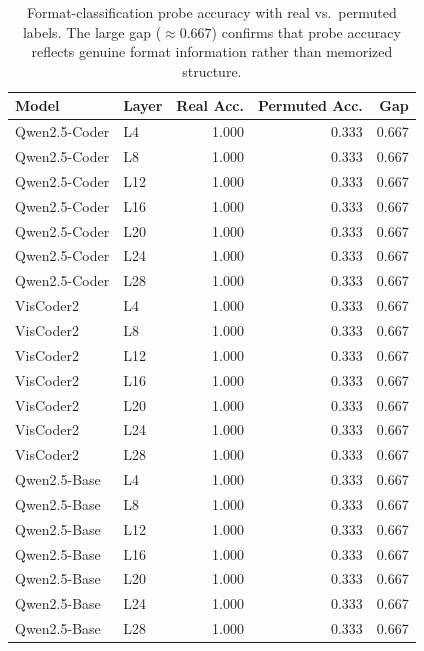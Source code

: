 \begin{table}[t]
\centering
\caption{Format-classification probe accuracy with real vs.\ permuted labels.  The large gap ($\approx 0.667$) confirms that probe accuracy reflects genuine format information rather than memorized structure.}
\label{tab:permuted_probe}
\small
\begin{tabular}{ll rrr}
\toprule
\textbf{Model} & \textbf{Layer} & \textbf{Real Acc.} & \textbf{Permuted Acc.} & \textbf{Gap} \\
\midrule
Qwen2.5-Coder & L4  & 1.000 & 0.333 & 0.667 \\
Qwen2.5-Coder & L8  & 1.000 & 0.333 & 0.667 \\
Qwen2.5-Coder & L12 & 1.000 & 0.333 & 0.667 \\
Qwen2.5-Coder & L16 & 1.000 & 0.333 & 0.667 \\
Qwen2.5-Coder & L20 & 1.000 & 0.333 & 0.667 \\
Qwen2.5-Coder & L24 & 1.000 & 0.333 & 0.667 \\
Qwen2.5-Coder & L28 & 1.000 & 0.333 & 0.667 \\
\midrule
VisCoder2      & L4  & 1.000 & 0.333 & 0.667 \\
VisCoder2      & L8  & 1.000 & 0.333 & 0.667 \\
VisCoder2      & L12 & 1.000 & 0.333 & 0.667 \\
VisCoder2      & L16 & 1.000 & 0.333 & 0.667 \\
VisCoder2      & L20 & 1.000 & 0.333 & 0.667 \\
VisCoder2      & L24 & 1.000 & 0.333 & 0.667 \\
VisCoder2      & L28 & 1.000 & 0.333 & 0.667 \\
\midrule
Qwen2.5-Base   & L4  & 1.000 & 0.333 & 0.667 \\
Qwen2.5-Base   & L8  & 1.000 & 0.333 & 0.667 \\
Qwen2.5-Base   & L12 & 1.000 & 0.333 & 0.667 \\
Qwen2.5-Base   & L16 & 1.000 & 0.333 & 0.667 \\
Qwen2.5-Base   & L20 & 1.000 & 0.333 & 0.667 \\
Qwen2.5-Base   & L24 & 1.000 & 0.333 & 0.667 \\
Qwen2.5-Base   & L28 & 1.000 & 0.333 & 0.667 \\
\bottomrule
\end{tabular}
\end{table}

